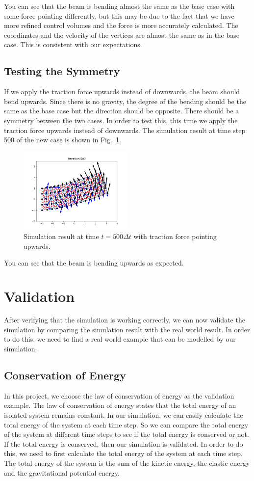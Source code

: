 \documentclass[acmtog]{acmart}
\begin{document}
You can see that the beam is bending almost the same as the base case with some force pointing differently, but this may be due to the fact that we have more refined control volumes and the force is more accurately calculated. The coordinates and the velocity of the vertices are almost the same as in the base case. This is consistent with our expectations.

\subsection{Testing the Symmetry}
If we apply the traction force upwards instead of downwards, the beam should bend upwards. Since there is no gravity, the degree of the bending should be the same as the base case but the direction should be opposite. There should be a symmetry between the two cases. In order to test this, this time we apply the traction force upwards instead of downwards. The simulation result at time step 500 of the new case is shown in Fig.~\ref{fig:symmetry}.

\begin{figure}[H]
  \centering
  \includegraphics[width=0.5\textwidth]{images/symmetry.png}
  \caption{Simulation result at time $t=500\Delta t$ with traction force pointing upwards.}
  \label{fig:symmetry}
\end{figure}

You can see that the beam is bending upwards as expected.

\section{Validation}
After verifying that the simulation is working correctly, we can now validate the simulation by comparing the simulation result with the real world result. In order to do this, we need to find a real world example that can be modelled by our simulation. 
\subsection{Conservation of Energy}
In this project, we choose the law of conservation of energy as the validation example. The law of conservation of energy states that the total energy of an isolated system remains constant. In our simulation, we can easily calculate the total energy of the system at each time step. So we can compare the total energy of the system at different time steps to see if the total energy is conserved or not. If the total energy is conserved, then our simulation is validated. In order to do this, we need to first calculate the total energy of the system at each time step. The total energy of the system is the sum of the kinetic energy, the elastic energy and the gravitational potential energy.
\end{document}
